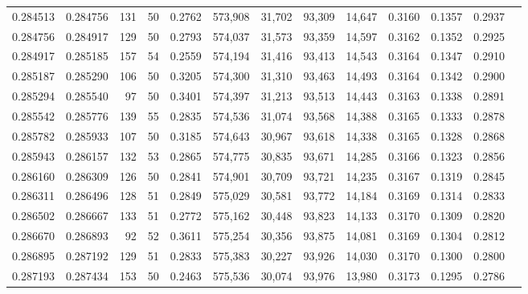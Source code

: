 \begin{tabular}{rrrrrrrrrrrrr}
0.284513 & 0.284756 &   131 &  50 &                                     0.2762 & 573,908 &  31,702 &  93,309 &  14,647 & 0.3160 & 0.1357 & 0.2937 \\
0.284756 & 0.284917 &   129 &  50 &                                     0.2793 & 574,037 &  31,573 &  93,359 &  14,597 & 0.3162 & 0.1352 & 0.2925 \\
0.284917 & 0.285185 &   157 &  54 &                                     0.2559 & 574,194 &  31,416 &  93,413 &  14,543 & 0.3164 & 0.1347 & 0.2910 \\
0.285187 & 0.285290 &   106 &  50 &                                     0.3205 & 574,300 &  31,310 &  93,463 &  14,493 & 0.3164 & 0.1342 & 0.2900 \\
0.285294 & 0.285540 &    97 &  50 &                                     0.3401 & 574,397 &  31,213 &  93,513 &  14,443 & 0.3163 & 0.1338 & 0.2891 \\
0.285542 & 0.285776 &   139 &  55 &                                     0.2835 & 574,536 &  31,074 &  93,568 &  14,388 & 0.3165 & 0.1333 & 0.2878 \\
0.285782 & 0.285933 &   107 &  50 &                                     0.3185 & 574,643 &  30,967 &  93,618 &  14,338 & 0.3165 & 0.1328 & 0.2868 \\
0.285943 & 0.286157 &   132 &  53 &                                     0.2865 & 574,775 &  30,835 &  93,671 &  14,285 & 0.3166 & 0.1323 & 0.2856 \\
0.286160 & 0.286309 &   126 &  50 &                                     0.2841 & 574,901 &  30,709 &  93,721 &  14,235 & 0.3167 & 0.1319 & 0.2845 \\
0.286311 & 0.286496 &   128 &  51 &                                     0.2849 & 575,029 &  30,581 &  93,772 &  14,184 & 0.3169 & 0.1314 & 0.2833 \\
0.286502 & 0.286667 &   133 &  51 &                                     0.2772 & 575,162 &  30,448 &  93,823 &  14,133 & 0.3170 & 0.1309 & 0.2820 \\
0.286670 & 0.286893 &    92 &  52 &                                     0.3611 & 575,254 &  30,356 &  93,875 &  14,081 & 0.3169 & 0.1304 & 0.2812 \\
0.286895 & 0.287192 &   129 &  51 &                                     0.2833 & 575,383 &  30,227 &  93,926 &  14,030 & 0.3170 & 0.1300 & 0.2800 \\
0.287193 & 0.287434 &   153 &  50 &                                     0.2463 & 575,536 &  30,074 &  93,976 &  13,980 & 0.3173 & 0.1295 & 0.2786 \\

\end{tabular}
